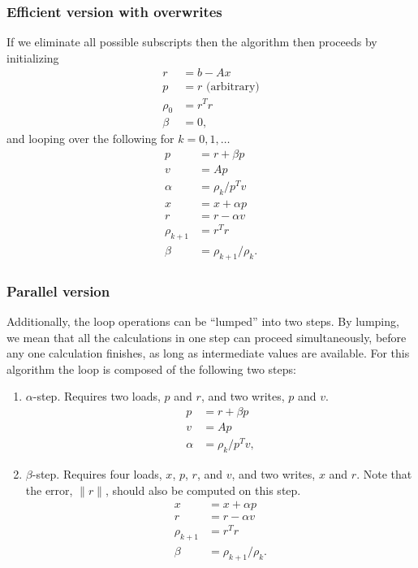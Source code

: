 \documentclass{article}
\begin{document}
\subsubsection{Efficient version with overwrites}
If we eliminate all possible subscripts then 
    the algorithm then proceeds by initializing
    \begin{subequations}\begin{align}
    r &= b - Ax \\
    p &= r \text{ (arbitrary)} \\
    \rho_{0} &= r^T r \\
    \beta &= 0,
    \end{align}\end{subequations}
and looping over the following for $k = 0, 1, \ldots$
    \begin{subequations}\begin{align}
    p &= r + \beta p \\
    v &= A p \\
    \alpha &= \rho_k / p^T v \\
    x &= x + \alpha p \\
    r &= r - \alpha v \\
    \rho_{k+1} &= r^T r \\
    \beta &= \rho_{k+1} / \rho_k.
    \end{align}\end{subequations}

\subsubsection{Parallel version}
Additionally, the loop operations can be ``lumped'' into two steps.
By lumping, we mean that all the calculations in one step can proceed
    simultaneously, before any one calculation finishes,
    as long as intermediate values are available.
For this algorithm the loop is composed of the following two steps:
\begin{enumerate}
\item $\alpha$-step. 
    Requires two loads, $p$ and $r$, and two writes, $p$ and $v$.
    \begin{subequations}\begin{align}
    p &= r + \beta p \\
    v &= A p \\
    \alpha &= \rho_k / p^T v,
    \end{align}\end{subequations}
\item $\beta$-step.
    Requires four loads, $x$, $p$, $r$, and $v$, and two writes, $x$ and $r$.
    Note that the error, $\|r\|$, should also be computed on this step.
    \begin{subequations}\begin{align}
    x &= x + \alpha p \\
    r &= r - \alpha v \\
    \rho_{k+1} &= r^T r \\
    \beta &= \rho_{k+1} / \rho_k.
    \end{align}\end{subequations}
\end{enumerate}
\end{document}
